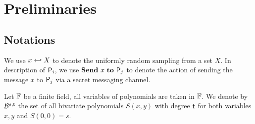 \section{Preliminaries}

\subsection{Notations}

We use $x \hookleftarrow X$ to denote the uniformly random sampling from a set $X$. In description of $\mathsf{P}_i$, we use $\textbf{Send}~ x ~\textbf{to}~ \mathsf{P}_j$ to denote the action of sending the message $x$ to $\mathsf{P}_j$ via a secret messaging channel.

Let $\mathbb{F}$ be a finite field, all variables of polynomials are taken in $\mathbb{F}$. We denote by $\mathcal{B}^{s,\mathsf{t}}$ the set of all bivariate polynomials $S(x,y)$ with degree $\mathsf{t}$ for both variables $x,y$ and $S(0,0) = s$.

